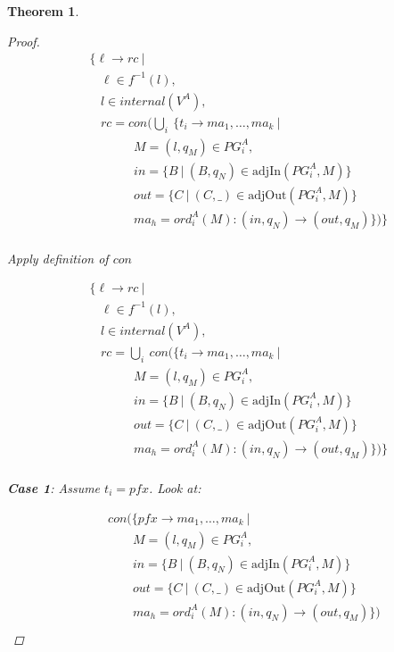 \documentclass[twocolumn]{sig-alternate-10pt}
\newtheorem{thm}{Theorem}
\begin{document}
\begin{thm}
\begin{proof}
  \[ \begin{array}{l}
     ~~~~~ \{ \ell \rightarrow rc ~\vert~ \\
     ~~~~~~~~~ \ell \in f^{-1}(l), \\
     ~~~~~~~~~ l \in internal(V^A), \\
     ~~~~~~~~~ rc = con(\bigcup_i~ \{ t_i \rightarrow ma_1, \dots, ma_k ~\vert~ \\
     ~~~~~~~~~~~~~~~~~~~~~ M = (l,q_M) \in PG^A_i, \\
     ~~~~~~~~~~~~~~~~~~~~~ in = \{ B ~\vert~ (B,q_N) \in \text{adjIn}(PG^A_i,M) \} \\
     ~~~~~~~~~~~~~~~~~~~~~ out = \{ C ~\vert~ (C,\_) \in \text{adjOut}(PG^A_i,M) \} \\
     ~~~~~~~~~~~~~~~~~~~~~ ma_h = ord^A_i(M) : (in,q_N) \rightarrow (out,q_M) \}) \} \\
  \end{array} \]%

  Apply definition of $con$

  \[ \begin{array}{l}
     ~~~~~ \{ \ell \rightarrow rc ~\vert~ \\
     ~~~~~~~~~ \ell \in f^{-1}(l), \\
     ~~~~~~~~~ l \in internal(V^A), \\
     ~~~~~~~~~ rc = \bigcup_i~ con(\{ t_i \rightarrow ma_1, \dots, ma_k ~\vert~ \\
     ~~~~~~~~~~~~~~~~~~~~~ M = (l,q_M) \in PG^A_i, \\
     ~~~~~~~~~~~~~~~~~~~~~ in = \{ B ~\vert~ (B,q_N) \in \text{adjIn}(PG^A_i,M) \} \\
     ~~~~~~~~~~~~~~~~~~~~~ out = \{ C ~\vert~ (C,\_) \in \text{adjOut}(PG^A_i,M) \} \\
     ~~~~~~~~~~~~~~~~~~~~~ ma_h = ord^A_i(M) : (in,q_N) \rightarrow (out,q_M) \}) \} \\
  \end{array} \]%

  \vspace{1em}
  \textbf{Case 1}: Assume $t_i = pfx$. Look at:

  \[ \begin{array}{l}
     ~~~~~~~~~ con(\{ pfx \rightarrow ma_1, \dots, ma_k ~\vert~ \\
     ~~~~~~~~~~~~~~~~~~ M = (l,q_M) \in PG^A_i, \\
     ~~~~~~~~~~~~~~~~~~ in = \{ B ~\vert~ (B,q_N) \in \text{adjIn}(PG^A_i,M) \} \\
     ~~~~~~~~~~~~~~~~~~ out = \{ C ~\vert~ (C,\_) \in \text{adjOut}(PG^A_i,M) \} \\
     ~~~~~~~~~~~~~~~~~~ ma_h = ord^A_i(M) : (in,q_N) \rightarrow (out,q_M) \}) \\
  \end{array} \]%


\end{proof}
\end{thm}
\end{document}
